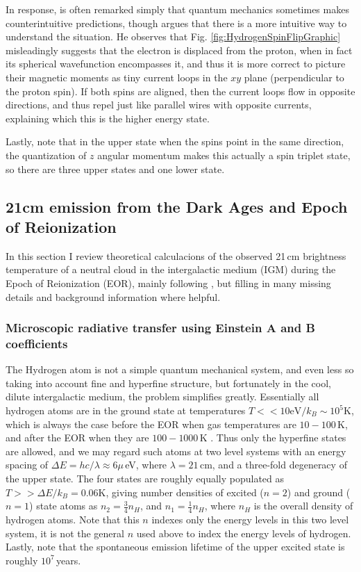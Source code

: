 In response, is often remarked simply that quantum mechanics sometimes makes counterintuitive predictions, though \citet{griffiths82} argues that there is a more intuitive way to understand the situation. He observes that Fig. \ref{fig:HydrogenSpinFlipGraphic} misleadingly suggests that the electron is displaced from the proton, when in fact its spherical wavefunction encompasses it, and thus it is more correct to picture their magnetic moments as tiny current loops in the $xy$ plane (perpendicular to the proton spin). If both spins are aligned, then the current loops flow in opposite directions, and thus repel just like parallel wires with opposite currents, explaining which this is the higher energy state.

Lastly, note that in the upper state when the spins point in the same direction, the quantization of $z$ angular momentum makes this actually a spin triplet state, so there are three upper states and one lower state.

\subsection{21cm emission from the Dark Ages and Epoch of Reionization}

In this section I review theoretical calculacions of the observed 21\,cm brightness temperature of a neutral cloud in the intergalactic medium (IGM) during the Epoch of Reionization (EOR), mainly following \citet{PritchardLoebReview}, but filling in many missing details and background information where helpful. 

\subsubsection{Microscopic radiative transfer using Einstein A and B coefficients}

The Hydrogen atom is not a simple quantum mechanical system, and even less so taking into account fine and hyperfine structure, but fortunately in the cool, dilute intergalactic medium, the problem simplifies greatly. Essentially all hydrogen atoms are in the ground state at temperatures  $T<<10\text{eV}/k_B\sim10^5$K, which is always the case before the EOR when gas temperatures are $10-100$\,K, and after the EOR when they are $100-1000$\,K \citep{FurlanettoReview}. Thus only the hyperfine states are allowed, and we may regard such atoms at two level systems with an energy spacing of $\Delta E=hc/\lambda\approx6\mu$\,eV, where $\lambda=21$\,cm, and a three-fold degeneracy of the upper state. The four states are roughly equally populated as $T>>\Delta E/k_B =0.06$K, giving number densities of excited ($n=2$) and ground ($n=1$) state atoms as $n_2=\frac{3}{4}n_H$, and $n_1=\frac{1}{4}n_H$, where $n_H$ is the overall density of hydrogen atoms. Note that this $n$ indexes only the energy levels in this two level system, it is not the general $n$ used above to index the energy levels of hydrogen. Lastly, note that the spontaneous emission lifetime of the upper excited state is roughly $10^7$\,years.


